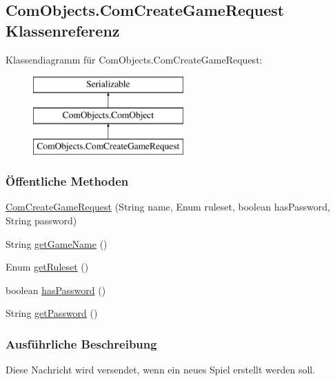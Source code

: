 \hypertarget{a00022}{\subsection{Com\-Objects.\-Com\-Create\-Game\-Request Klassenreferenz}
\label{a00022}
}
Klassendiagramm für Com\-Objects.\-Com\-Create\-Game\-Request\-:\begin{figure}[H]
\begin{center}
\leavevmode
\includegraphics[height=3.000000cm]{a00022}
\end{center}
\end{figure}
\subsubsection*{Öffentliche Methoden}
\begin{DoxyCompactItemize}
\item 
\hyperlink{a00022_aaf1ae68768968cb49221f0c29837dffa}{Com\-Create\-Game\-Request} (String name, Enum ruleset, boolean has\-Password, String password)
\item 
String \hyperlink{a00022_a06976fffc41a66420d249b068106640e}{get\-Game\-Name} ()
\item 
Enum \hyperlink{a00022_a122cf6895c8ea900d838ce798350730c}{get\-Ruleset} ()
\item 
boolean \hyperlink{a00022_afbbb12d942d480dfd1e4f63da4806db5}{has\-Password} ()
\item 
String \hyperlink{a00022_a77cbcd29cffda3d6a312de7a760f7e0e}{get\-Password} ()
\end{DoxyCompactItemize}


\subsubsection{Ausführliche Beschreibung}
Diese Nachricht wird versendet, wenn ein neues Spiel erstellt werden soll. 

